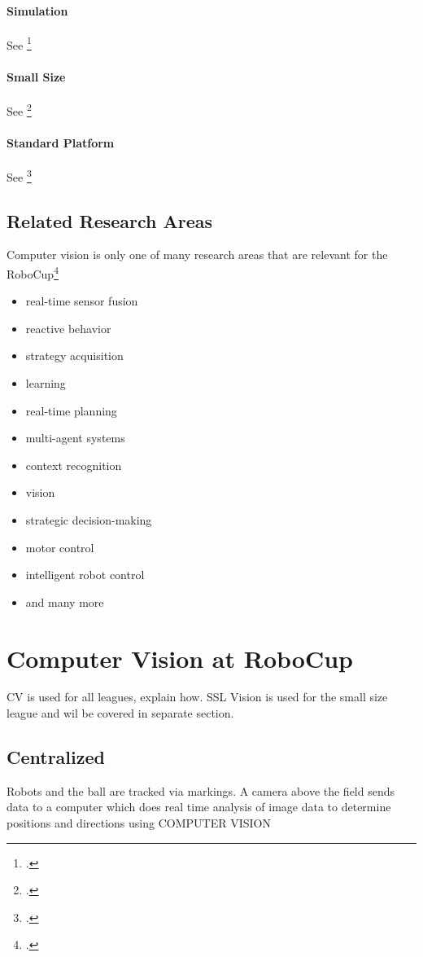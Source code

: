 \paragraph{Simulation} See \footcite[Cf.][]{robo_simu_wiki}
 
\paragraph{Small Size} See \footcite[Cf.][]{robo_ssl_wiki}
 
\paragraph{Standard Platform} See \footcite[Cf.][]{robo_std_wiki}



\subsection{Related Research Areas \label{sec:robo-research}}
Computer vision is only one of many research areas that are relevant for the
RoboCup\footcite[Cf.][]{robo_objectives}
\begin{itemize}
  \item real-time sensor fusion
  \item reactive behavior
  \item strategy acquisition
  \item learning
  \item real-time planning
  \item multi-agent systems
  \item context recognition
  \item vision
  \item strategic decision-making
  \item motor control
  \item intelligent robot control
  \item and many more
\end{itemize}




\newpage
\section{Computer Vision at RoboCup \label{sec:cv-robo}}

CV is used for all leagues, explain how.
SSL Vision is used for the small size league and wil be covered in separate
section.

\subsection{Centralized}
Robots and the ball are tracked via markings. A camera above the field sends
data to a computer which does real time analysis of image data to determine
positions and directions using COMPUTER VISION

